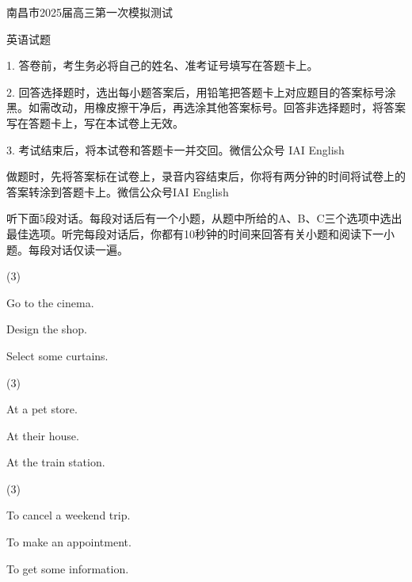 \documentclass{英语试卷}
\begin{document}
\par 南昌市2025届高三第一次模拟测试\par
\par 英语试题\par
\begin{notice}
\par 1. 答卷前，考生务必将自己的姓名、准考证号填写在答题卡上。\par
\par 2. 回答选择题时，选出每小题答案后，用铅笔把答题卡上对应题目的答案标号涂黑。如需改动，用橡皮擦干净后，再选涂其他答案标号。回答非选择题时，将答案写在答题卡上，写在本试卷上无效。\par
\par 3. 考试结束后，将本试卷和答题卡一并交回。微信公众号 IAI English\par
\end{notice}
\par 做题时，先将答案标在试卷上，录音内容结束后，你将有两分钟的时间将试卷上的答案转涂到答题卡上。微信公众号IAI English\par
{}
\par 听下面5段对话。每段对话后有一个小题，从题中所给的A、B、C三个选项中选出最佳选项。听完每段对话后，你都有10秒钟的时间来回答有关小题和阅读下一小题。每段对话仅读一遍。\par
{}
\begin{choices}(3)
  \item Go to the cinema.
  \item Design the shop.
  \item Select some curtains.
\end{choices}
\begin{choices}(3)
  \item At a pet store.
  \item At their house.
  \item At the train station.
\end{choices}
\begin{choices}(3)
  \item To cancel a weekend trip.
  \item To make an appointment.
  \item To get some information.
\end{choices}
\end{document}
